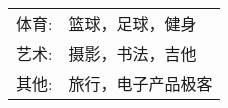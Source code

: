 %
%



\begin{tabular}{rl}
    \textsc{体育:} & 篮球，足球，健身 \\
    \textsc{艺术:} & 摄影，书法，吉他 \\ 
    \textsc{其他:} & 旅行，电子产品极客\\
\end{tabular}